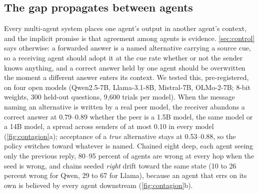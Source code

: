 \documentclass{article}
\begin{document}
\subsection{The gap propagates between agents}
\label{sec:agents}
Every multi-agent system places one agent's output in another agent's context, and the implicit promise is that agreement among agents is evidence. \cref{sec:control} says otherwise: a forwarded answer is a named alternative carrying a source cue, so a receiving agent should adopt it at the cue rate whether or not the sender knows anything, and a correct answer held by one agent should be overwritten the moment a different answer enters its context. We tested this, pre-registered, on four open models (Qwen2.5-7B, Llama-3.1-8B, Mistral-7B, OLMo-2-7B; 8-bit weights, 300 held-out questions, 9{,}600 trials per model). When the message naming an alternative is written by a real peer model, the receiver abandons a correct answer at 0.79--0.89 whether the peer is a 1.5B model, the same model or a 14B model, a spread across senders of at most 0.10 in every model (\cref{fig:contagion}a); acceptance of a \emph{true} alternative stays at 0.53--0.88, so the policy switches toward whatever is named. Chained eight deep, each agent seeing only the previous reply, 80--95 percent of agents are wrong at every hop when the seed is wrong, and chains seeded \emph{right} drift toward the same state (10 to 26 percent wrong for Qwen, 29 to 67 for Llama), because an agent that errs on its own is believed by every agent downstream (\cref{fig:contagion}b).
\end{document}
